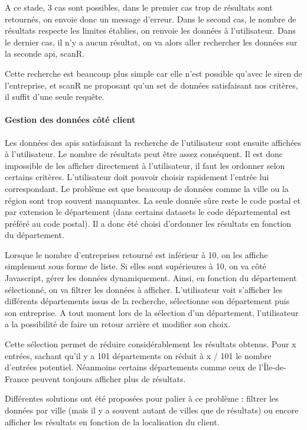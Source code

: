 \documentclass[french]{article}
\begin{document}
{A ce stade, 3 cas sont possibles, dans le premier cas trop de résultats sont retournés, on envoie donc un message d'erreur. Dans le second cas, le nombre de résultats respecte les limites établies, on renvoie les données à l'utilisateur. Dans le dernier cas, il n'y a aucun résultat, on va alors aller rechercher les données sur la seconde api, scanR.

Cette recherche est beaucoup plus simple car elle n'est possible qu'avec le siren de l'entreprise, et scanR ne proposant qu'un set de données satisfaisant nos critères, il suffit d'une seule requête.

\paragraph{Gestion des données côté client}

Les données des apis satisfaisant la recherche de l'utilisateur sont ensuite affichées à l'utilisateur. Le nombre de résultats peut être assez conséquent. Il est donc impossible de les afficher directement à l'utilisateur, il faut les ordonner selon certains critères. L'utilisateur doit pouvoir choisir rapidement l'entrée lui correspondant. Le problème est que beaucoup de données comme la ville ou la région sont trop souvent manquantes. La seule donnée sûre reste le code postal et par extension le département (dans certains datasets le code départemental est préféré au code postal). Il a donc été choisi d'ordonner les résultats en fonction du département.

Lorsque le nombre d'entreprises retourné est inférieur à 10, on les affiche simplement sous forme de liste. Si elles sont supérieures à 10, on va côté Javascript, gérer les données dynamiquement. Ainsi, en fonction du département sélectionné, on va filtrer les données à afficher. L'utilisateur voit s'afficher les différents départements issus de la recherche, sélectionne son département puis son entreprise. A tout moment lors de la sélection d'un département, l'utilisateur a la possibilité de faire un retour arrière et modifier son choix.

Cette sélection permet de réduire considérablement les résultats obtenus. Pour x entrées, sachant qu'il y a 101 départements on réduit à x / 101 le nombre d'entrées potentiel. Néanmoins certains départements comme ceux de l'Île-de-France peuvent toujours afficher plus de résultats.

Différentes solutions ont été proposées pour palier à ce problème : filtrer les données par ville (mais il y a souvent autant de villes que de résultats) ou encore afficher les résultats en fonction de la localisation du client.

}
\end{document}

